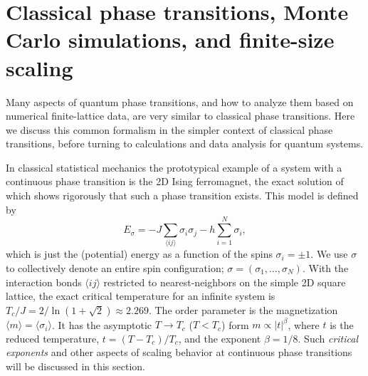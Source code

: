 \documentclass[draft,numberedheadings]{aipproc}
\begin{document}
\section{Classical phase transitions, Monte Carlo simulations, and finite-size scaling}
\label{transitions}

Many aspects of quantum phase transitions, and how to analyze them based on numerical finite-lattice data, are very similar to classical phase 
transitions. Here we discuss this common formalism in the simpler context of classical phase transitions, before turning to calculations and data analysis 
for quantum systems.

In classical statistical mechanics the prototypical example of a system with a continuous phase transition is the 2D Ising ferromagnet, the 
exact solution \cite{onsager,baxter} of which shows rigorously that such a phase transition exists. This model is defined by 
\begin{equation}
E_\sigma = -J\sum_{\langle ij\rangle} \sigma_i\sigma_j - h\sum_{i=1}^N \sigma_i,
\label{isingh}
\end{equation}
which is just the (potential) energy as a function of the spins $\sigma_{i}=\pm 1$. We use $\sigma$ to collectively denote an entire spin configuration; 
$\sigma=(\sigma_1,\ldots,\sigma_N)$. With the interaction bonds $\langle ij\rangle$ restricted to nearest-neighbors on the simple 2D square lattice, 
the exact critical temperature for an infinite system is $T_c/J=2/\ln(1+\sqrt{2}) \approx 2.269$. The order parameter is the magnetization 
$\langle m\rangle=\langle \sigma_i\rangle$. It has the asymptotic $T\to T_c$ ($T<T_c$) form $m \propto |t|^\beta$, where $t$ is the reduced temperature, 
$t=(T-T_c)/T_c$, and the exponent $\beta=1/8$. Such {\it critical exponents} and other aspects of scaling behavior at continuous phase transitions 
will be discussed in this section.
\end{document}
